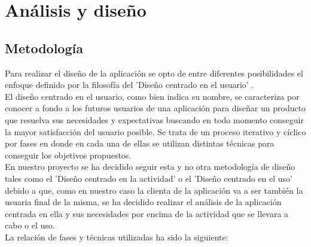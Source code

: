 \documentclass[11pt,a4paper]{article}
\begin{document}
\newpage 



\section{Análisis y diseño}
\bigskip 

\subsection{Metodología}\label{metodologia} 
Para realizar el diseño de la aplicación se opto de entre diferentes posibilidades el enfoque definido por la filosofía del 'Diseño centrado en el usuario' \cite{15}.
\\

El diseño centrado en el usuario, como bien indica su nombre, se caracteriza por conocer a fondo a los futuros usuarios de una aplicación para diseñar un producto que resuelva sus necesidades y expectativas buscando en todo momento conseguir la mayor satisfacción del usuario posible. Se trata de un proceso iterativo y cíclico por fases en donde en cada una de ellas se utilizan distintas técnicas para conseguir los objetivos propuestos. 
\\

En nuestro proyecto se ha decidido seguir esta y no otra metodología de diseño tales como el 'Diseño centrado en la actividad' o el 'Diseño centrado en el uso' debido a que, como en nuestro caso la clienta de la aplicación va a ser también la usuaria final de la misma, se ha decidido realizar el análisis de la aplicación centrada en ella y sus necesidades por encima de la actividad que se llevara a cabo o el uso.
\\

La relación de fases y técnicas utilizadas ha sido la siguiente:
\end{document}
